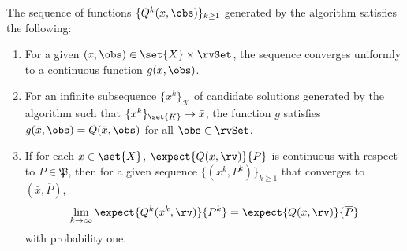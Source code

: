 \documentclass[11pt]{article}
\newcommand{\frakP}{\mathfrak{P}}
\begin{document}
\begin{lemma}
The sequence of functions $\{Q^k(x,\obs)\}_{k \geq 1}$ generated by the algorithm satisfies the following:
\begin{enumerate}[label=(\alph{enumi})]
    \item For a given $(x,\obs) \in \set{X} \times \rvSet$, the sequence converges uniformly to a continuous function $g(x,\obs)$. \label{lemma:uniformConvergence}
    \item For an infinite subsequence $\{x^k\}_\mathcal{K}$ of candidate solutions generated by the algorithm such that $\{x^k\}_{\set{K}} \rightarrow \bar{x}$, the function $g$ satisfies $g(\bar{x}, \obs) = Q(\bar{x},\obs)$ for all $\obs \in \rvSet$. \label{lemma:asymptoticSupport}
    \item If for each $x \in \set{X}$, $\expect{Q(x,\rv)}{P}$ is continuous with respect to $P \in \frakP$, then for a given sequence $\{(x^k, P^k)\}_{k \geq 1}$ that converges to $(\bar{x}, \overline{P})$,  
    \begin{align*}
   \lim_{k\rightarrow \infty}\expect{Q^k(x^k, \rv)}{P^k} = \expect{Q(\bar{x}, \rv)}{\overline{P}}
    \end{align*}
    with probability one. \label{lemma:expectedRecourse}
\end{enumerate}
\end{lemma}
\end{document}
